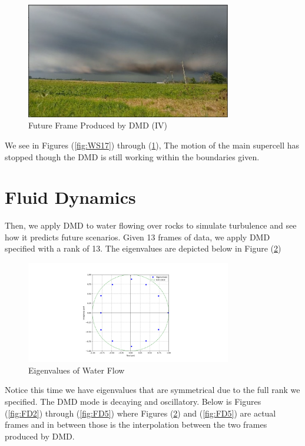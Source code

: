 \documentclass[12pt]{report}
\begin{document}
\begin{figure}[H]
    \centering
    \includegraphics[width=0.8\textwidth]{Weather pics/WS20.png}
    \caption{Future Frame Produced by DMD (IV)} \label{fig:WS20}
\end{figure}
\noindent

We see in Figures (\ref{fig:WS17}) through (\ref{fig:WS20}), The motion of the main supercell has stopped though the DMD is still working within the boundaries given.

\section{Fluid Dynamics}

Then, we apply DMD to water flowing over rocks to simulate turbulence and see how it predicts future scenarios. Given 13 frames of data, we apply DMD specified with a rank of 13. The eigenvalues are depicted below in Figure (\ref{fig:FD1})

\begin{figure}[H]
    \centering
    \includegraphics[width=0.8\textwidth]{Fluid Dynamics/FD1.png}
    \caption{Eigenvalues of Water Flow} \label{fig:FD1}
\end{figure}
\noindent
Notice this time we have eigenvalues that are symmetrical due to the full
rank we specified. The DMD mode is decaying and oscillatory. Below is Figures (\ref{fig:FD2}) through (\ref{fig:FD5}) where Figures (\ref{fig:FD1}) and (\ref{fig:FD5}) are actual frames and
in between those is the interpolation between the two frames produced by DMD.
\end{document}
